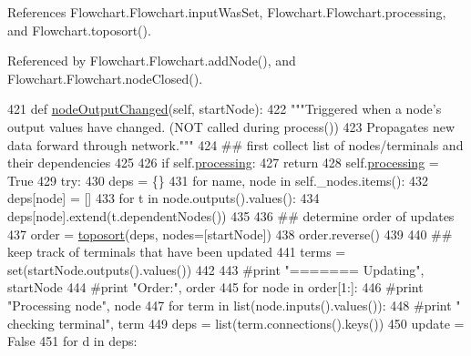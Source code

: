 References Flowchart.\+Flowchart.\+input\+Was\+Set, Flowchart.\+Flowchart.\+processing, and Flowchart.\+toposort().



Referenced by Flowchart.\+Flowchart.\+add\+Node(), and Flowchart.\+Flowchart.\+node\+Closed().


\begin{DoxyCode}
421     \textcolor{keyword}{def }\hyperlink{classFlowchart_1_1Flowchart_a597ecc78975eb0282a7fb27a18607f04}{nodeOutputChanged}(self, startNode):
422         \textcolor{stringliteral}{"""Triggered when a node's output values have changed. (NOT called during process())}
423 \textcolor{stringliteral}{        Propagates new data forward through network."""}
424         \textcolor{comment}{## first collect list of nodes/terminals and their dependencies}
425         
426         \textcolor{keywordflow}{if} self.\hyperlink{classFlowchart_1_1Flowchart_a7a15f175c575286a959cf951028df731}{processing}:
427             \textcolor{keywordflow}{return}
428         self.\hyperlink{classFlowchart_1_1Flowchart_a7a15f175c575286a959cf951028df731}{processing} = \textcolor{keyword}{True}
429         \textcolor{keywordflow}{try}:
430             deps = \{\}
431             \textcolor{keywordflow}{for} name, node \textcolor{keywordflow}{in} self.\_nodes.items():
432                 deps[node] = []
433                 \textcolor{keywordflow}{for} t \textcolor{keywordflow}{in} node.outputs().values():
434                     deps[node].extend(t.dependentNodes())
435             
436             \textcolor{comment}{## determine order of updates }
437             order = \hyperlink{namespaceFlowchart_a3a8dec1a56afa0fb5e704625606501b6}{toposort}(deps, nodes=[startNode])
438             order.reverse()
439             
440             \textcolor{comment}{## keep track of terminals that have been updated}
441             terms = set(startNode.outputs().values())
442             
443             \textcolor{comment}{#print "======= Updating", startNode}
444             \textcolor{comment}{#print "Order:", order}
445             \textcolor{keywordflow}{for} node \textcolor{keywordflow}{in} order[1:]:
446                 \textcolor{comment}{#print "Processing node", node}
447                 \textcolor{keywordflow}{for} term \textcolor{keywordflow}{in} list(node.inputs().values()):
448                     \textcolor{comment}{#print "  checking terminal", term}
449                     deps = list(term.connections().keys())
450                     update = \textcolor{keyword}{False}
451                     \textcolor{keywordflow}{for} d \textcolor{keywordflow}{in} deps:

\end{DoxyCode}

